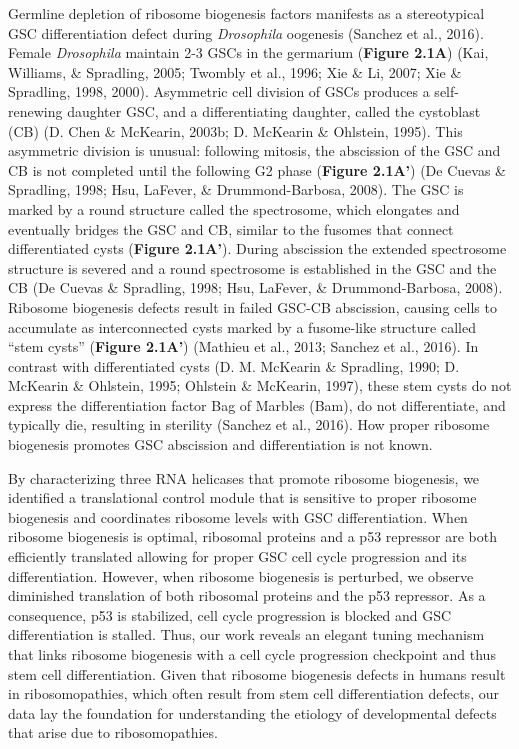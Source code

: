 \documentclass[12pt,oneside]{reedthesis}
\begin{document}
Germline depletion of ribosome biogenesis factors manifests as a
stereotypical GSC differentiation defect during \emph{Drosophila} oogenesis
(Sanchez et al., 2016). Female \emph{Drosophila} maintain 2-3 GSCs in the
germarium (\textbf{Figure 2.1A}) (Kai, Williams, \& Spradling, 2005; Twombly et al., 1996; Xie \& Li, 2007; Xie \& Spradling, 1998, 2000). Asymmetric cell division of GSCs produces a
self-renewing daughter GSC, and a differentiating daughter, called the
cystoblast (CB) (D. Chen \& McKearin, 2003b; D. McKearin \& Ohlstein, 1995). This asymmetric
division is unusual: following mitosis, the abscission of the GSC and CB
is not completed until the following G2 phase (\textbf{Figure 2.1A'})
(De Cuevas \& Spradling, 1998; Hsu, LaFever, \& Drummond-Barbosa, 2008). The GSC is marked by a
round structure called the spectrosome, which elongates and eventually
bridges the GSC and CB, similar to the fusomes that connect
differentiated cysts (\textbf{Figure 2.1A'}). During abscission the extended
spectrosome structure is severed and a round spectrosome is established
in the GSC and the CB (De Cuevas \& Spradling, 1998; Hsu, LaFever, \& Drummond-Barbosa, 2008).
Ribosome biogenesis defects result in failed GSC-CB abscission, causing
cells to accumulate as interconnected cysts marked by a fusome-like
structure called ``stem cysts'' (\textbf{Figure 2.1A'}) (Mathieu et al., 2013; Sanchez et al., 2016). In contrast with differentiated cysts
(D. M. McKearin \& Spradling, 1990; D. McKearin \& Ohlstein, 1995; Ohlstein \& McKearin, 1997), these stem cysts do not
express the differentiation factor Bag of Marbles (Bam), do not
differentiate, and typically die, resulting in sterility
(Sanchez et al., 2016). How proper ribosome biogenesis promotes GSC
abscission and differentiation is not known.

By characterizing three RNA helicases that promote ribosome biogenesis,
we identified a translational control module that is sensitive to proper
ribosome biogenesis and coordinates ribosome levels with GSC
differentiation. When ribosome biogenesis is optimal, ribosomal proteins
and a p53 repressor are both efficiently translated allowing for proper
GSC cell cycle progression and its differentiation. However, when
ribosome biogenesis is perturbed, we observe diminished translation of
both ribosomal proteins and the p53 repressor. As a consequence, p53 is
stabilized, cell cycle progression is blocked and GSC differentiation is
stalled. Thus, our work reveals an elegant tuning mechanism that links
ribosome biogenesis with a cell cycle progression checkpoint and thus
stem cell differentiation. Given that ribosome biogenesis defects in
humans result in ribosomopathies, which often result from stem cell
differentiation defects, our data lay the foundation for understanding
the etiology of developmental defects that arise due to ribosomopathies.
\end{document}
